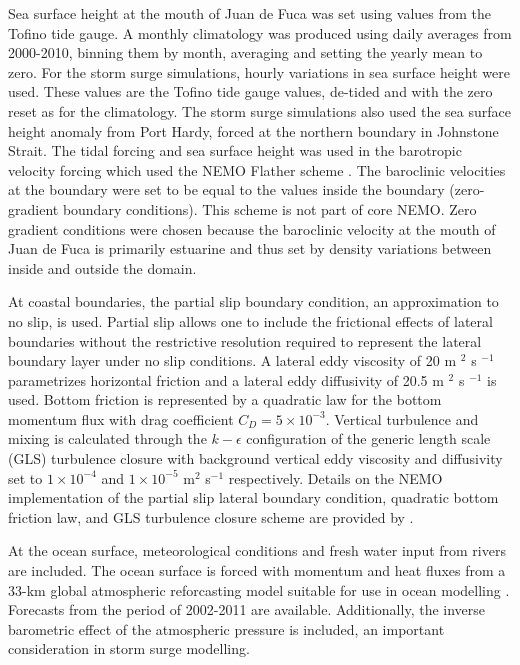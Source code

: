 \documentclass[pdftex,10pt]{article}
\begin{document}
Sea surface height at the mouth of Juan de Fuca was set using values from the Tofino tide gauge.  A monthly climatology was produced using daily averages from 2000-2010, binning them by month, averaging and setting the yearly mean to zero.  For the storm surge simulations, hourly variations in sea surface height were used.  These values are the Tofino tide gauge values, de-tided and with the zero reset as for the climatology. The storm surge simulations also used the sea surface height anomaly from Port Hardy, forced at the northern boundary in Johnstone Strait. The tidal forcing and sea surface height was used in the barotropic velocity forcing which used the NEMO Flather scheme \citep{flather1994storm, madec2012nemo}.
The baroclinic velocities at the boundary were set to be equal to the values inside the boundary (zero-gradient boundary conditions).  This scheme is not part of core NEMO.  Zero gradient conditions were chosen because the baroclinic velocity at the mouth of Juan de Fuca is primarily estuarine and thus set by density variations between inside and outside the domain.

At coastal boundaries, the partial slip boundary condition, an approximation to no slip, is used. Partial slip allows one to include the frictional effects of lateral boundaries without the restrictive resolution required to represent the lateral boundary layer under no slip conditions. A lateral eddy viscosity of 20 m $^2$ s $^{-1}$ parametrizes horizontal friction and a lateral eddy diffusivity of 20.5 m $^2$ s $^{-1}$ is used.  Bottom friction is represented by a quadratic law for the bottom momentum flux with drag coefficient $C_D = 5\times 10^{-3}$. Vertical turbulence and mixing is calculated through the $k-\epsilon$ configuration of the generic length scale (GLS) turbulence closure \citep{umlauf2003generic} with background vertical eddy viscosity and diffusivity set to $1\times10^{-4}$ and $1\times10^{-5}$ m$^2$ s$^{-1}$ respectively. Details on the NEMO implementation of the partial slip lateral boundary condition, quadratic bottom friction law, and GLS turbulence closure scheme are provided by \citet{madec2012nemo}.

At the ocean surface, meteorological conditions and fresh water input from rivers are included. The ocean surface is forced with momentum and heat fluxes from a 33-km global atmospheric reforcasting model suitable for use in ocean modelling \citep{smith2013new}. Forecasts from the period of 2002-2011 are available. Additionally, the inverse barometric effect of the atmospheric pressure is included, an important consideration in storm surge modelling. 
\end{document}

